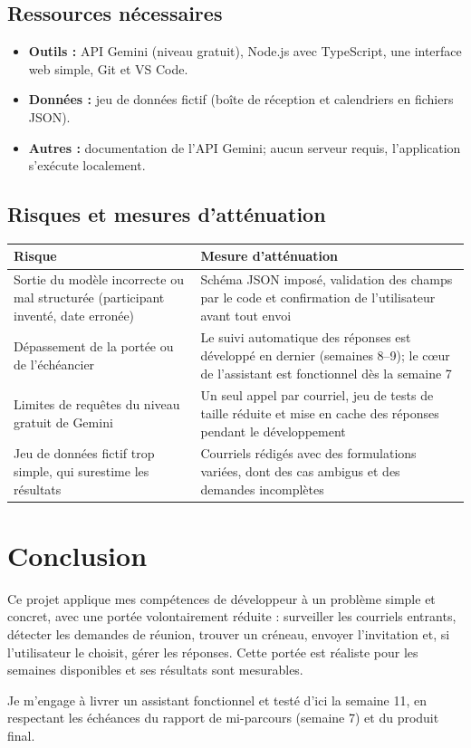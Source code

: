 \documentclass[11pt,letterpaper]{article}
\begin{document}
\subsection{Ressources nécessaires}

\begin{itemize}
  \item \textbf{Outils :} API Gemini (niveau gratuit), Node.js avec TypeScript, une interface web simple, Git et VS Code.
  \item \textbf{Données :} jeu de données fictif (boîte de réception et calendriers en fichiers JSON).
  \item \textbf{Autres :} documentation de l'API Gemini; aucun serveur requis, l'application s'exécute localement.
\end{itemize}

\subsection{Risques et mesures d'atténuation}

\begin{center}
\begin{tabularx}{\textwidth}{@{}XX@{}}
\toprule
\textbf{Risque} & \textbf{Mesure d'atténuation} \\
\midrule
Sortie du modèle incorrecte ou mal structurée (participant inventé, date erronée) & Schéma JSON imposé, validation des champs par le code et confirmation de l'utilisateur avant tout envoi \\
Dépassement de la portée ou de l'échéancier & Le suivi automatique des réponses est développé en dernier (semaines 8--9); le cœur de l'assistant est fonctionnel dès la semaine 7 \\
Limites de requêtes du niveau gratuit de Gemini & Un seul appel par courriel, jeu de tests de taille réduite et mise en cache des réponses pendant le développement \\
Jeu de données fictif trop simple, qui surestime les résultats & Courriels rédigés avec des formulations variées, dont des cas ambigus et des demandes incomplètes \\
\bottomrule
\end{tabularx}
\end{center}

\section{Conclusion}

Ce projet applique mes compétences de développeur à un problème simple et concret, avec une portée volontairement réduite : surveiller les courriels entrants, détecter les demandes de réunion, trouver un créneau, envoyer l'invitation et, si l'utilisateur le choisit, gérer les réponses. Cette portée est réaliste pour les semaines disponibles et ses résultats sont mesurables.

Je m'engage à livrer un assistant fonctionnel et testé d'ici la semaine 11, en respectant les échéances du rapport de mi-parcours (semaine 7) et du produit final.
\end{document}
